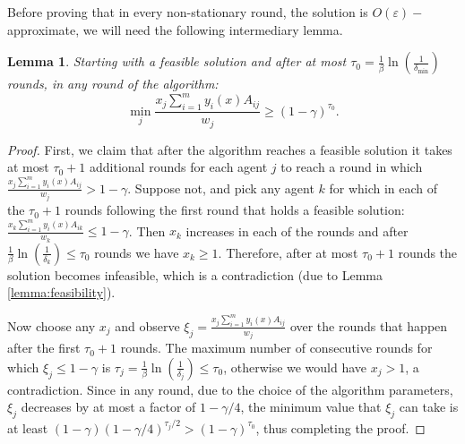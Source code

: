 \documentclass[11pt]{article}
\newtheorem{lemma}[theorem]{Lemma}
\begin{document}
Before proving that in every non-stationary round, the solution is $O(\varepsilon)-$approximate, we will need the following intermediary lemma.
\begin{lemma}\label{lemma:cond-lower-bound}
Starting with a feasible solution and after at most $\tau_0 = \frac{1}{\beta}\ln\left(\frac{1}{\delta_{\min}}\right)$ rounds, in any round of the algorithm:
\begin{equation*}
\min_j \frac{x_j \sum_{i=1}^m y_i(x)A_{ij}}{w_j} \geq (1-\gamma)^{\tau_0}.
\end{equation*}
\end{lemma}
\begin{proof}
First, we claim that after the algorithm reaches a feasible solution it takes at most $\tau_0 + 1$ additional rounds for each agent $j$ to reach a round in which $\frac{x_j \sum_{i=1}^m y_i(x)A_{ij}}{w_j} > 1-\gamma$. Suppose not, and pick any agent $k$ for which in each of the $\tau_0 + 1$ rounds following the first round that holds a feasible solution: $
\frac{x_k\sum_{i=1}^m y_i(x)A_{ik}}{w_k}\leq 1-\gamma$. Then $x_k$ increases in each of the rounds and after $\frac{1}{\beta}\ln(\frac{1}{\delta_k})\leq \tau_0$ rounds we have $x_k \geq 1$. Therefore, after at most $\tau_0+1$ rounds the solution becomes infeasible, which is a contradiction (due to Lemma \ref{lemma:feasibility}).

Now choose any $x_j$ and observe $\xi_j = \frac{x_j \sum_{i=1}^m y_i(x)A_{ij}}{w_j}$ over the rounds that happen after the first $\tau_0 + 1$ rounds. The maximum number of consecutive rounds for which $\xi_j\leq 1 -\gamma$ is $\tau_j = \frac{1}{\beta}\ln(\frac{1}{\delta_j})\leq \tau_0$, otherwise we would have $x_j>1$, a contradiction. Since in any round, due to the choice of the algorithm parameters, $\xi_j$ decreases by at most a factor of $1-\gamma/4$, the minimum value that $\xi_j$ can take is at least $(1-\gamma)(1-\gamma/4)^{\tau_j/2}>(1-\gamma)^{\tau_0}$, thus completing the proof.
\end{proof}
\end{document}
